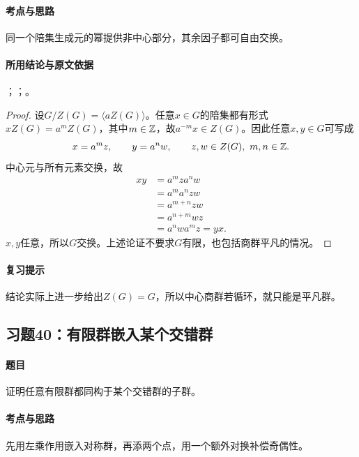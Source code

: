 \paragraph{考点与思路}
同一个陪集生成元的幂提供非中心部分，其余因子都可自由交换。

\paragraph{所用结论与原文依据}
；；。


\begin{proof}
设$G/Z(G)=\langle aZ(G)\rangle$。任意$x\in G$的陪集都有形式$xZ(G)=a^mZ(G)$，其中$m\in\mathbb Z$，故$a^{-m}x\in Z(G)$。因此任意$x,y\in G$可写成
\[
x=a^mz,\qquad y=a^nw,
\qquad z,w\in Z(G),\ m,n\in\mathbb Z.
\]
中心元与所有元素交换，故
\begin{align*}
xy&=a^mza^nw\\
&=a^ma^nzw\\
&=a^{m+n}zw\\
&=a^{n+m}wz\\
&=a^nwa^mz=yx.
\end{align*}
$x,y$任意，所以$G$交换。上述论证不要求$G$有限，也包括商群平凡的情况。
\end{proof}

\paragraph{复习提示}
结论实际上进一步给出$Z(G)=G$，所以中心商群若循环，就只能是平凡群。


\subsection{习题40：\texorpdfstring{有限群嵌入某个交错群}{有限群嵌入某个交错群}}
\label{ex:2:40}

\paragraph{题目}
证明任意有限群都同构于某个交错群的子群。

\paragraph{考点与思路}
先用左乘作用嵌入对称群，再添两个点，用一个额外对换补偿奇偶性。

